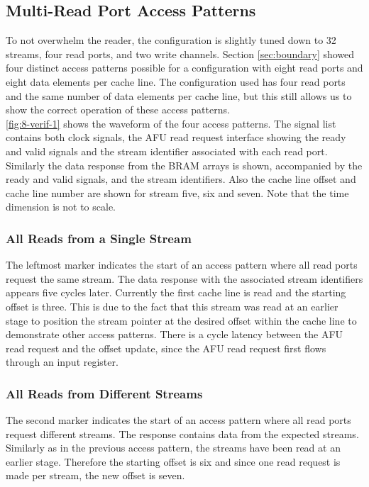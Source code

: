 \subsection{Multi-Read Port Access Patterns}
To not overwhelm the reader, the configuration is slightly tuned down to 32 streams, four read ports, and two write channels. Section \ref{sec:boundary} showed four distinct access patterns possible for a configuration with eight read ports and eight data elements per cache line. The configuration used has four read ports and the same number of data elements per cache line, but this still allows us to show the correct operation of these access patterns.\\
\autoref{fig:8-verif-1} shows the waveform of the four access patterns. The signal list contains both clock signals, the AFU read request interface showing the ready and valid signals and the stream identifier associated with each read port. Similarly the data response from the BRAM arrays is shown, accompanied by the ready and valid signals, and the stream identifiers. Also the cache line offset and cache line number are shown for stream five, six and seven. Note that the time dimension is not to scale.

\subsubsection{All Reads from a Single Stream}
The leftmost marker indicates the start of an access pattern where all read ports request the same stream. The data response with the associated stream identifiers appears five cycles later. Currently the first cache line is read and the starting offset is three. This is due to the fact that this stream was read at an earlier stage to position the stream pointer at the desired offset within the cache line to demonstrate other access patterns. There is a cycle latency between the AFU read request and the offset update, since the AFU read request first flows through an input register.

\subsubsection{All Reads from Different Streams}
The second marker indicates the start of an access pattern where all read ports request different streams. The response contains data from the expected streams. Similarly as in the previous access pattern, the streams have been read at an earlier stage. Therefore the starting offset is six and since one read request is made per stream, the new offset is seven.

